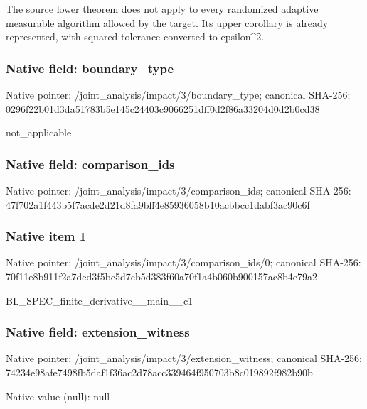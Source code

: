 \documentclass[10pt,a4paper]{article}
\begin{document}
\begingroup\raggedright\sloppy The source lower theorem does not apply to every randomized adaptive measurable algorithm allowed by the target. Its upper corollary is already represented,\allowbreak{} with squared tolerance converted to epsilon\textasciicircum{}2.\par\endgroup

\subsubsection{Native field: boundary\_\allowbreak{}type}
Native pointer: /joint\_\allowbreak{}analysis/impact/3/boundary\_\allowbreak{}type; canonical SHA-256: 0296f22b01d3da51783b5e145c24403c9066251dff0d2f86a33204d0d2b0cd38

\begingroup\raggedright\sloppy not\_\allowbreak{}applicable\par\endgroup

\subsubsection{Native field: comparison\_\allowbreak{}ids}
Native pointer: /joint\_\allowbreak{}analysis/impact/3/comparison\_\allowbreak{}ids; canonical SHA-256: 47f702a1f443b5f7acde2d21d8fa9bff4e85936058b10acbbcc1dabf3ac90c6f

\subsubsection{Native item 1}
Native pointer: /joint\_\allowbreak{}analysis/impact/3/comparison\_\allowbreak{}ids/0; canonical SHA-256: 70f11e8b911f2a7ded3f5bc5d7cb5d383f60a70f1a4b060b900157ac8b4e79a2

\begingroup\raggedright\sloppy BL\_\allowbreak{}SPEC\_\allowbreak{}finite\_\allowbreak{}derivative\_\allowbreak{}\_\allowbreak{}main\_\allowbreak{}\_\allowbreak{}c1\par\endgroup

\subsubsection{Native field: extension\_\allowbreak{}witness}
Native pointer: /joint\_\allowbreak{}analysis/impact/3/extension\_\allowbreak{}witness; canonical SHA-256: 74234e98afe7498fb5daf1f36ac2d78acc339464f950703b8c019892f982b90b

Native value (null): null
\end{document}
